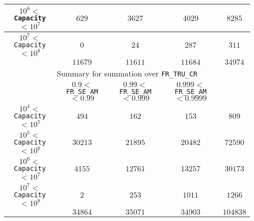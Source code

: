 \begin{center}
\begin{table}[htbp]
\begin{center}
\begin{tabular}{|c||c|c|c||c|}
\hline
$10^6 <$ \texttt{Capacity} $< 10^7$&$629$&$3627$&$4029$&$8285$\\
\hline
$10^7 <$ \texttt{Capacity} $< 10^8$&$0$&$24$&$287$&$311$\\
\hline
&$11679$&$11611$&$11684$&$34974$\\
\hline
\hline
\multicolumn{5}{|c|}{Summary for summation over \texttt{FR\_TRU\_CR}}\\
\hline
&$0.9 <$ \texttt{FR\_SE\_AM} $< 0.99$&$0.99 <$ \texttt{FR\_SE\_AM} $< 0.999$&$0.999 <$ \texttt{FR\_SE\_AM} $< 0.9999$&\\
\hline
$10^4 <$ \texttt{Capacity} $< 10^5$&$494$&$162$&$153$&$809$\\
\hline
$10^5 <$ \texttt{Capacity} $< 10^6$&$30213$&$21895$&$20482$&$72590$\\
\hline
$10^6 <$ \texttt{Capacity} $< 10^7$&$4155$&$12761$&$13257$&$30173$\\
\hline
$10^7 <$ \texttt{Capacity} $< 10^8$&$2$&$253$&$1011$&$1266$\\
\hline
&$34864$&$35071$&$34903$&$104838$\\
\hline
\end{tabular}
\end{center}
\end{table}
\end{center}




